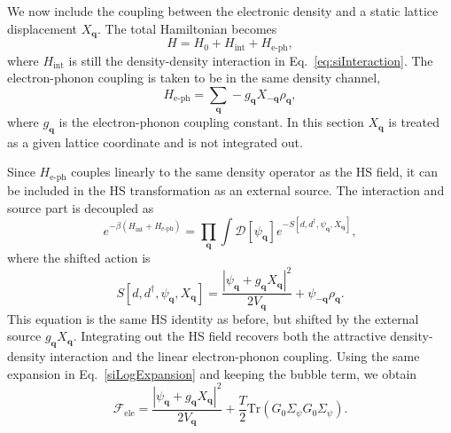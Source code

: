 \documentclass[aps,prl,article,twocolumn,preprintnumbers,amsmath,amssymb,superscriptaddress]{revtex4-2}
\begin{document}
We now include the coupling between the electronic density and a static
lattice displacement $X_{\mathbf q}$.  The total Hamiltonian becomes
\begin{equation}
H
=
H_0
+
H_{\mathrm{int}}
+
H_{\mathrm{e\text{-}ph}},
\end{equation}
where $H_{\mathrm{int}}$ is still the density-density interaction in
Eq.~\eqref{eq:siInteraction}.  The electron-phonon coupling is taken to
be in the same density channel,
\begin{equation}
H_{\mathrm{e\text{-}ph}}
=
\sum_{\mathbf q}
-g_{\mathbf q}X_{-\mathbf q}\rho_{\mathbf q},
\end{equation}
where $g_{\mathbf q}$ is the electron-phonon coupling constant.  In this
section $X_{\mathbf q}$ is treated as a given lattice coordinate and is
not integrated out.

Since $H_{\mathrm{e\text{-}ph}}$ couples linearly to the same density
operator as the HS field, it can be included in the HS transformation as
an external source.  The interaction and source part is decoupled as
\begin{equation}
e^{-\beta (H_{\mathrm{int}}+H_{\mathrm{e\text{-}ph}})}
=
\prod_{\mathbf q}
\int
\mathcal D[\psi_{\mathbf q}]
e^{-S[d,d^\dagger,\psi_{\mathbf q},X_{\mathbf q}]},
\end{equation}
where the shifted action is
\begin{equation}
S[d,d^\dagger,\psi_{\mathbf q},X_{\mathbf q}]
=
\frac{
\left|
\psi_{\mathbf q}
+
g_{\mathbf q}X_{\mathbf q}
\right|^2
}{
2V_{\mathbf q}
}
+
\psi_{-\mathbf q}\rho_{\mathbf q}.
\end{equation}
This equation is the same HS identity as before, but shifted by the
external source $g_{\mathbf q}X_{\mathbf q}$.  Integrating out the HS
field recovers both the attractive density-density interaction and the
linear electron-phonon coupling.
Using the same expansion in Eq.~\eqref{siLogExpansion} and keeping the
bubble term, we obtain
\begin{equation}
\mathcal F_{\mathrm{ele}}
=
\frac{
\left|
\psi_{\mathbf q}
+
g_{\mathbf q}X_{\mathbf q}
\right|^2
}{
2V_{\mathbf q}
}
+
\frac{T}{2}
\mathrm{Tr}
\left(
G_0\Sigma_\psi
G_0\Sigma_\psi
\right).
\end{equation}
\end{document}
